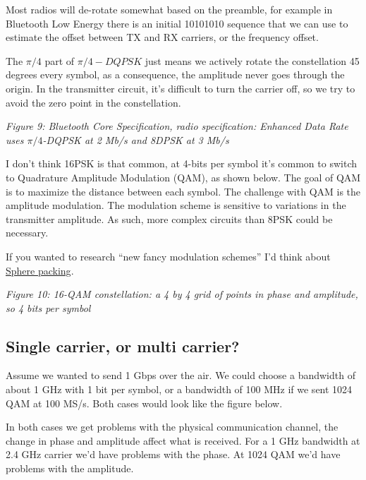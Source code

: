 Most radios will de-rotate somewhat based on the preamble, for example
in Bluetooth Low Energy there is an initial 10101010 sequence that we
can use to estimate the offset between TX and RX carriers, or the
frequency offset.

The \(\pi/4\) part of \(\pi/4-DQPSK\) just means we actively rotate the
constellation 45 degrees every symbol, as a consequence, the amplitude
never goes through the origin. In the transmitter circuit, it's
difficult to turn the carrier off, so we try to avoid the zero point in
the constellation.


{
\centering
{}
}

\emph{Figure 9: Bluetooth Core Specification, radio specification:
Enhanced Data Rate uses \(\pi/4\)-DQPSK at 2 Mb/s and 8DPSK at 3 Mb/s}

I don't think 16PSK is that common, at 4-bits per symbol it's common to
switch to Quadrature Amplitude Modulation (QAM), as shown below. The
goal of QAM is to maximize the distance between each symbol. The
challenge with QAM is the amplitude modulation. The modulation scheme is
sensitive to variations in the transmitter amplitude. As such, more
complex circuits than 8PSK could be necessary.

If you wanted to research ``new fancy modulation schemes'' I'd think
about \href{https://en.wikipedia.org/wiki/Sphere_packing}{Sphere
packing}.


{
\centering
{}
}

\emph{Figure 10: 16-QAM constellation: a 4 by 4 grid of points in phase
and amplitude, so 4 bits per symbol}

\subsection{Single carrier, or multi
carrier?}\label{single-carrier-or-multi-carrier}

Assume we wanted to send 1 Gbps over the air. We could choose a
bandwidth of about 1 GHz with 1 bit per symbol, or a bandwidth of 100
MHz if we sent 1024 QAM at 100 MS/s. Both cases would look like the
figure below.

In both cases we get problems with the physical communication channel,
the change in phase and amplitude affect what is received. For a 1 GHz
bandwidth at 2.4 GHz carrier we'd have problems with the phase. At 1024
QAM we'd have problems with the amplitude.


{
\centering
{}
}

